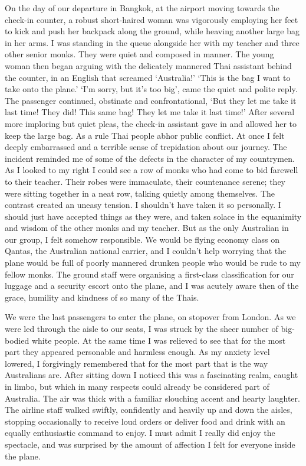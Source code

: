 On the day of our departure in Bangkok, at the airport moving towards
the check-in counter, a robust short-haired woman was vigorously
employing her feet to kick and push her backpack along the ground, while
heaving another large bag in her arms. I was standing in the queue
alongside her with my teacher and three other senior monks. They were
quiet and composed in manner. The young woman then began arguing with
the delicately mannered Thai assistant behind the counter, in an English
that screamed `Australia!' `This is the bag I want to take onto the
plane.' `I'm sorry, but it's too big', came the quiet and polite reply. 
The passenger continued, obstinate and confrontational, `But they let me
take it last time! They did! This same bag! They let me take it last
time!' After several more imploring but quiet pleas, the check-in
assistant gave in and allowed her to keep the large bag. As a rule Thai
people abhor public conflict. At once I felt deeply embarrassed and a
terrible sense of trepidation about our journey. The incident reminded
me of some of the defects in the character of my countrymen. As I looked
to my right I could see a row of monks who had come to bid farewell to
their teacher. Their robes were immaculate, their countenance serene; 
they were sitting together in a neat row, talking quietly among
themselves. The contrast created an uneasy tension. I shouldn't have
taken it so personally. I should just have accepted things as they were, 
and taken solace in the equanimity and wisdom of the other monks and my
teacher. But as the only Australian in our group, I felt somehow
responsible. We would be flying economy class on Qantas, the Australian
national carrier, and I couldn't help worrying that the plane would be
full of poorly mannered drunken people who would be rude to my fellow
monks. The ground staff were organising a first-class classification for
our luggage and a security escort onto the plane, and I was acutely
aware then of the grace, humility and kindness of so many of the Thais. 

We were the last passengers to enter the plane, on stopover from London. 
As we were led through the aisle to our seats, I was struck by the sheer
number of big-bodied white people. At the same time I was relieved to
see that for the most part they appeared personable and harmless enough. 
As my anxiety level lowered, I forgivingly remembered that for the most
part that is the way Australians are. After sitting down I noticed this
was a fascinating realm, caught in limbo, but which in many respects
could already be considered part of Australia. The air was thick with a
familiar slouching accent and hearty laughter. The airline staff walked
swiftly, confidently and heavily up and down the aisles, stopping
occasionally to receive loud orders or deliver food and drink with an
equally enthusiastic command to enjoy. I must admit I really did enjoy
the spectacle, and was surprised by the amount of affection I felt for
everyone inside the plane. 

